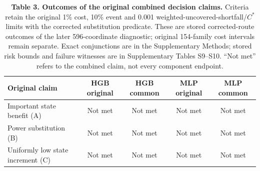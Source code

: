 \begin{table}[H]
\centering
\caption*{\textbf{Table 3. Outcomes of the original combined decision claims.} Criteria retain the original 1\% cost, 10\% event and 0.001 weighted-uncovered-shortfall/$C^*$ limits with the corrected substitution predicate. These are stored corrected-route outcomes of the later 596-coordinate diagnostic; original 154-family cost intervals remain separate. Exact conjunctions are in the Supplementary Methods; stored risk bounds and failure witnesses are in Supplementary Tables S9--S10. ``Not met'' refers to the combined claim, not every component endpoint.}
\small
\begin{tabular}{lcccc}
\toprule
Original claim & HGB original & HGB common & MLP original & MLP common \\
\midrule
Important state benefit (A) & Not met & Not met & Not met & Not met \\
Power substitution (B) & Not met & Not met & Not met & Not met \\
Uniformly low state increment (C) & Not met & Not met & Not met & Not met \\
\bottomrule
\end{tabular}
\end{table}
